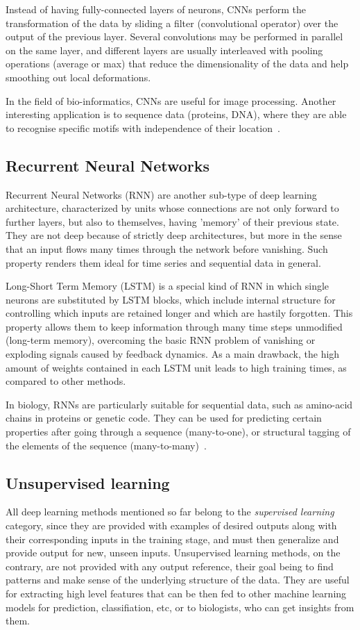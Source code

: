 \documentclass[journal]{IEEEtran}
\begin{document}
Instead of having fully-connected layers of neurons, CNNs perform the transformation of the data by sliding a filter (convolutional operator) over the output of the previous layer. Several convolutions may be performed in parallel on the same layer, and different layers are usually interleaved with pooling operations (average or max) that reduce the dimensionality of the data and help smoothing out local deformations.

In the field of bio-informatics, CNNs are useful for image processing. Another interesting application is to sequence data (proteins, DNA), where they are able to recognise specific motifs with independence of their location~\cite{Jurtz2017}.

\subsection{Recurrent Neural Networks}

Recurrent Neural Networks (RNN) are another sub-type of deep learning architecture, characterized by units whose connections are not only forward to further layers, but also to themselves, having 'memory' of their previous state. They are not deep because of strictly deep architectures, but more in the sense that an input flows many times through the network before vanishing. Such property renders them ideal for time series and sequential data in general.

Long-Short Term Memory (LSTM) is a special kind of RNN in which single neurons are substituted by LSTM blocks, which include internal structure for controlling which inputs are retained longer and which are hastily forgotten. This property allows them to keep information through many time steps unmodified (long-term memory), overcoming the basic RNN problem of vanishing or exploding signals caused by feedback dynamics. As a main drawback, the high amount of weights contained in each LSTM unit leads to high training times, as compared to other methods.

In biology, RNNs are particularly suitable for sequential data, such as amino-acid chains in proteins or genetic code. They can be used for predicting certain properties after going through a sequence (many-to-one), or structural tagging of the elements of the sequence (many-to-many)~\cite{Jurtz2017}.

\subsection{Unsupervised learning}
All deep learning methods mentioned so far belong to the \textit{supervised learning} category, since they are provided with examples of desired outputs along with their corresponding inputs in the training stage, and must then generalize and provide output for new, unseen inputs. Unsupervised learning methods, on the contrary, are not provided with any output reference, their goal being to find patterns and make sense of the underlying structure of the data. They are useful for extracting high level features that can be then fed to other machine learning models for prediction, classifiation, etc, or to biologists, who can get insights from them.
\end{document}
